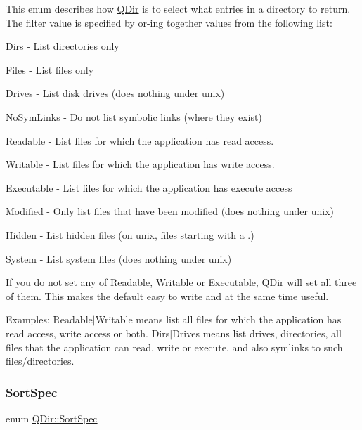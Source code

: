 This enum describes how \mbox{\hyperlink{class_q_dir}{Q\+Dir}} is to select what entries in a directory to return. The filter value is specified by or-\/ing together values from the following list\+: 
\begin{DoxyItemize}
\item {\ttfamily Dirs} -\/ List directories only 
\item {\ttfamily Files} -\/ List files only


\item {\ttfamily Drives} -\/ List disk drives (does nothing under unix) 
\item {\ttfamily No\+Sym\+Links} -\/ Do not list symbolic links (where they exist) 
\item {\ttfamily Readable} -\/ List files for which the application has read access. 
\item {\ttfamily Writable} -\/ List files for which the application has write access. 
\item {\ttfamily Executable} -\/ List files for which the application has execute access 
\item {\ttfamily Modified} -\/ Only list files that have been modified (does nothing under unix) 
\item {\ttfamily Hidden} -\/ List hidden files (on unix, files starting with a .) 
\item {\ttfamily System} -\/ List system files (does nothing under unix) 
\end{DoxyItemize}

If you do not set any of {\ttfamily Readable}, {\ttfamily Writable} or {\ttfamily Executable}, \mbox{\hyperlink{class_q_dir}{Q\+Dir}} will set all three of them. This makes the default easy to write and at the same time useful.

Examples\+: {\ttfamily Readable$\vert$\+Writable} means list all files for which the application has read access, write access or both. {\ttfamily Dirs$\vert$\+Drives} means list drives, directories, all files that the application can read, write or execute, and also symlinks to such files/directories. \mbox{\label{class_q_dir_a428a858abe9593efc498b6641b41994c}} 
\subsubsection{\texorpdfstring{SortSpec}{SortSpec}}
{\footnotesize\ttfamily enum \mbox{\hyperlink{class_q_dir_a428a858abe9593efc498b6641b41994c}{Q\+Dir\+::\+Sort\+Spec}}}

